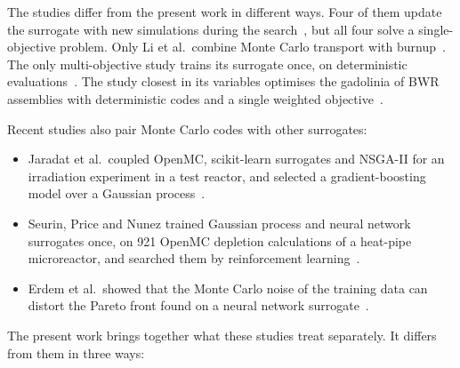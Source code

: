 The studies differ from the present work in different ways. Four of them
update the surrogate with new simulations during the
search~\cite{sobes_2021_ai_core,li_2022_kriging_lbe,kuwagaki_2026_bo_sfr,tung_lee_2020_gd_bwr},
but all four solve a single-objective problem. Only Li et al.\ combine
Monte Carlo transport with burnup~\cite{li_2022_kriging_lbe}. The only
multi-objective study trains its surrogate once, on deterministic
evaluations~\cite{zeng_2020_sfr_opt}. The study closest in its variables
optimises the gadolinia of BWR assemblies with deterministic codes and a
single weighted objective~\cite{tung_lee_2020_gd_bwr}.

Recent studies also pair Monte Carlo codes with other surrogates:

\begin{itemize}
  \item Jaradat et al.\ coupled OpenMC, scikit-learn surrogates and
        NSGA-II for an irradiation experiment in a test reactor, and
        selected a gradient-boosting model over a Gaussian
        process~\cite{jaradat_2026_atr}.

  \item Seurin, Price and Nunez trained Gaussian process and neural
        network surrogates once, on 921 OpenMC depletion calculations of a
        heat-pipe microreactor, and searched them by reinforcement
        learning~\cite{seurin_2025_hpmr}.

  \item Erdem et al.\ showed that the Monte Carlo noise of the training
        data can distort the Pareto front found on a neural network
        surrogate~\cite{erdem_2025_mc_uncertainty}.
\end{itemize}

The present work brings together what these studies treat separately.
It differs from them in three ways:

